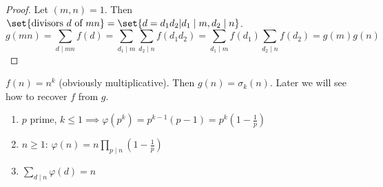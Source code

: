 \documentclass{article}
\begin{document}
\begin{proof}
    Let $(m, n) = 1$.
    Then $\set{ \text{divisors } d \text{ of } mn } = \set{ d = d_1 d_2 | d_1 \mid m, d_2 \mid n }$.
    \begin{equation*}
        g(mn) = \sum_{d \mid mn} f(d) = \sum_{d_1 \mid m} \sum_{d_2 \mid n} f(d_1 d_2) = \sum_{d_1 \mid m} f(d_1) \sum_{d_2 \mid n} f(d_2) = g(m)g(n)
    \end{equation*}
\end{proof}

\begin{eg}
    $f(n) = n^k$ (obviously multiplicative). Then $g(n) = \sigma_k(n)$.
    Later we will see how to recover $f$ from $g$.
\end{eg}


\begin{nthm}\label{thm:2.5}
    \leavevmode
    \begin{enumerate}[label=(\roman*)]
        \item $p$ prime, $k \leq 1 \implies \varphi(p^k) = p^{k-1} (p-1) = p^k \left(1-\frac{1}{p}\right)$
        \item $n \geq 1$: $\varphi (n) = n \prod_{p \mid n}\left( 1-\frac{1}{p} \right)$
        \item $\sum_{d \mid n} \varphi(d) = n$
    \end{enumerate}
\end{nthm}
\end{document}
